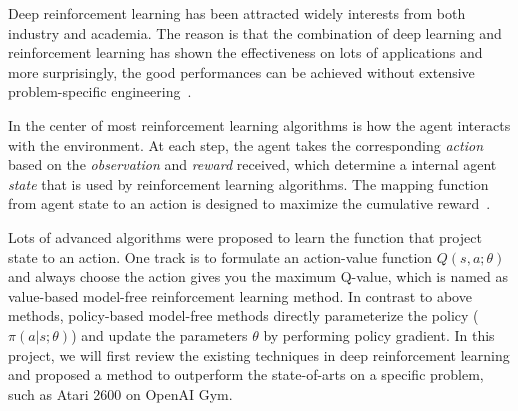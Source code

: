 

Deep reinforcement learning has been attracted widely interests from both
industry and academia. The reason is that the combination of deep learning and
reinforcement learning has shown the effectiveness on lots of applications
and more surprisingly, the good performances can be achieved without extensive
 problem-specific engineering~\cite{mnih2015human,silver2016mastering}.

In the center of most reinforcement learning algorithms is how the agent interacts
with the environment. At each step, the agent takes the corresponding \emph{action}
based on the \emph{observation} and \emph{reward} received, which determine a internal
agent \emph{state} that is used by reinforcement learning algorithms. The mapping function
from agent state to an action is designed to maximize the cumulative reward~\cite{sutton1998introduction}. 

Lots of advanced algorithms were proposed to learn the function that project
state to an action. One track is to formulate an action-value function $Q(s,a;
\theta)$ and always choose the action gives you the maximum Q-value, which is
named as value-based model-free reinforcement learning method. In contrast to
above methods, policy-based model-free methods directly parameterize the
policy ($\pi(a|s; \theta)$) and update the parameters $\theta$ by performing
policy gradient. In this project, we will first review the existing techniques in 
deep reinforcement learning and proposed a method to outperform the state-of-arts 
on a specific problem, such as Atari 2600 on OpenAI Gym.


